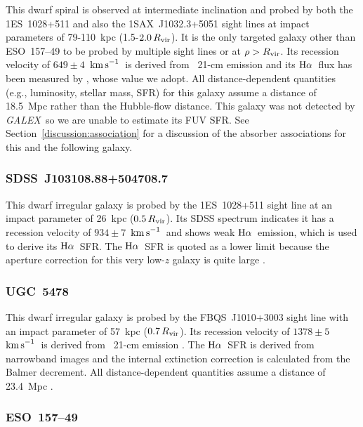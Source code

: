 \documentclass[twocolumn,twocolappendix,tighten,times]{aastex6}
\newcommand{\HI}{\ion{H}{1}}
\newcommand{\galex}{{\sl GALEX}}
\newcommand{\Ha}{\ensuremath{{\rm H}\alpha}}
\newcommand{\kms}{\ensuremath{{\rm km\,s}^{-1}}}
\begin{document}
This dwarf spiral is observed at intermediate inclination and probed
by both the 1ES~1028+511 and also the 1SAX~J1032.3+5051 sight lines at impact
parameters of 79-110~kpc (1.5-$2.0\,R_{\rm vir}$). It is the only targeted 
galaxy other than ESO~157--49 to be probed by multiple sight
lines or at $\rho>R_{\rm vir}$. Its recession velocity of $649\pm4$~\kms\ 
is derived from \HI\ 21-cm emission \citep{schneider92} and its \Ha\ flux 
has been measured by \citet{kennicutt08}, whose value we adopt. All 
distance-dependent quantities (e.g., luminosity, stellar mass, SFR) for 
this galaxy assume a distance of 18.5~Mpc \citep{tully88,sorce14} rather 
than the Hubble-flow distance. This galaxy was not detected by \galex\ so 
we are unable to estimate its FUV SFR. See Section~\ref{discussion:association}
for a discussion of the absorber associations for this and the following galaxy.


\subsubsection{SDSS~J103108.88+504708.7}
\label{indiv:galaxies:sdssj1031+50}

This dwarf irregular galaxy is probed by the 1ES~1028+511 sight line
at an  impact parameter of 26~kpc ($0.5\,R_{\rm vir}$). Its SDSS
spectrum indicates it has a recession velocity of $934\pm7$~\kms\ and
shows weak \Ha\ emission, which is used to derive its \Ha\ SFR. The 
\Ha\ SFR is quoted as a lower limit because the aperture correction for 
this very low-$z$ galaxy is quite large \citep{iglesias-paramo13}.


\subsubsection{UGC~5478}
\label{indiv:galaxies:ugc5478}

This dwarf irregular galaxy is probed by the FBQS~J1010+3003 sight
line with an  impact parameter of 57~kpc ($0.7\,R_{\rm vir}$). Its
recession velocity of $1378\pm5$~\kms\ is derived from \HI\ 21-cm
emission \citep{devaucouleurs91}. The \Ha\ SFR is derived from 
narrowband images and the internal extinction correction is calculated 
from the Balmer decrement. All distance-dependent quantities assume a distance 
of 23.4~Mpc \citep{tully88}.


\subsubsection{ESO~157--49}
\label{indiv:galaxies:eso157-49}
\end{document}
